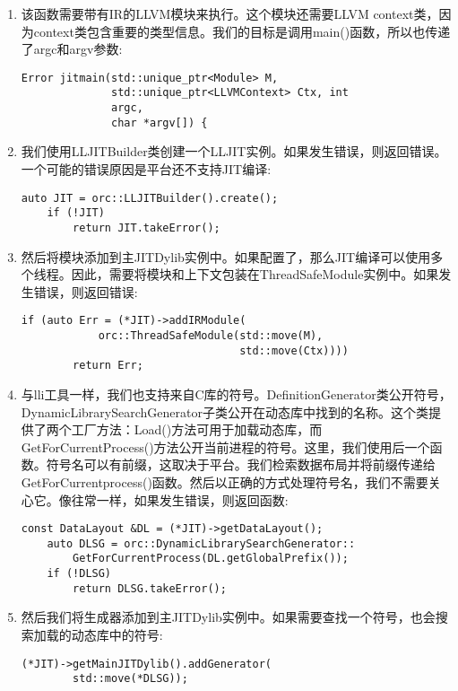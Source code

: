 \begin{enumerate}
\item 该函数需要带有IR的LLVM模块来执行。这个模块还需要LLVM context类，因为context类包含重要的类型信息。我们的目标是调用main()函数，所以也传递了argc和argv参数:
\begin{lstlisting}[caption={}]
Error jitmain(std::unique_ptr<Module> M,
			  std::unique_ptr<LLVMContext> Ctx, int 
			  argc,
			  char *argv[]) {
\end{lstlisting}

\item 我们使用LLJITBuilder类创建一个LLJIT实例。如果发生错误，则返回错误。一个可能的错误原因是平台还不支持JIT编译:
\begin{lstlisting}[caption={}]
	auto JIT = orc::LLJITBuilder().create();
	if (!JIT)
		return JIT.takeError();
\end{lstlisting}

\item 然后将模块添加到主JITDylib实例中。如果配置了，那么JIT编译可以使用多个线程。因此，需要将模块和上下文包装在ThreadSafeModule实例中。如果发生错误，则返回错误:
\begin{lstlisting}[caption={}]
	if (auto Err = (*JIT)->addIRModule(
			orc::ThreadSafeModule(std::move(M),
								  std::move(Ctx))))
		return Err;
\end{lstlisting}

\item 与lli工具一样，我们也支持来自C库的符号。DefinitionGenerator类公开符号，DynamicLibrary\allowbreak SearchGenerator子类公开在动态库中找到的名称。这个类提供了两个工厂方法：Load()方法可用于加载动态库，而GetForCurrentProcess()方法公开当前进程的符号。这里，我们使用后一个函数。符号名可以有前缀，这取决于平台。我们检索数据布局并将前缀传递给GetForCurrentprocess()函数。然后以正确的方式处理符号名，我们不需要关心它。像往常一样，如果发生错误，则返回函数:
\begin{lstlisting}[caption={}]
	const DataLayout &DL = (*JIT)->getDataLayout();
	auto DLSG = orc::DynamicLibrarySearchGenerator::
		GetForCurrentProcess(DL.getGlobalPrefix());
	if (!DLSG)
		return DLSG.takeError();
\end{lstlisting}

\item 然后我们将生成器添加到主JITDylib实例中。如果需要查找一个符号，也会搜索加载的动态库中的符号:
\begin{lstlisting}[caption={}]
	(*JIT)->getMainJITDylib().addGenerator(
		std::move(*DLSG));
\end{lstlisting}


\end{enumerate}
